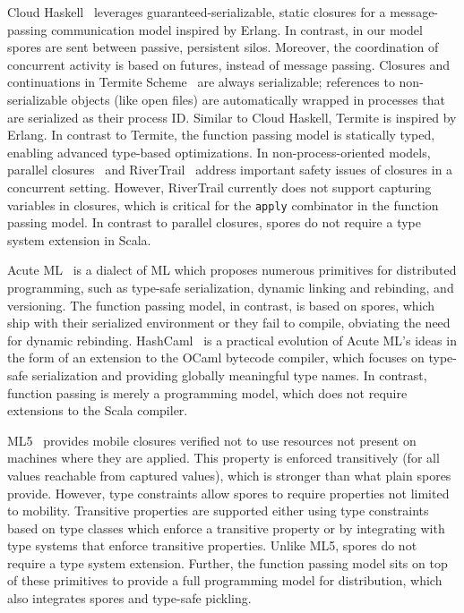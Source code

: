 \documentclass{jfp1}
\begin{document}
Cloud Haskell~\cite{CloudHaskell} leverages guaranteed-serializable, static
closures for a message-passing communication model inspired by Erlang. In
contrast, in our model spores are sent between passive, persistent silos.
Moreover, the coordination of concurrent activity is based on futures, instead
of message passing. Closures and continuations in Termite
Scheme~\cite{TermiteScheme} are always serializable; references to
non-serializable objects (like open files) are automatically wrapped in
processes that are serialized as their process ID. Similar to Cloud Haskell,
Termite is inspired by Erlang. In contrast to Termite, the function passing
model is statically typed, enabling advanced type-based optimizations. In
non-process-oriented models, parallel closures~\cite{ParallelClosures} and
RiverTrail~\cite{RiverTrail} address important safety issues of closures in a
concurrent setting. However, RiverTrail currently does not support capturing
variables in closures, which is critical for the \texttt{apply} combinator in the
function passing model. In contrast to parallel closures, spores do not require
a type system extension in Scala.

Acute ML~\cite{AcuteML} is a dialect of ML which proposes numerous primitives
for distributed programming, such as type-safe serialization, dynamic linking
and rebinding, and versioning. The function passing model, in contrast, is based
on spores, which ship with their serialized environment or they fail to compile,
obviating the need for dynamic rebinding. HashCaml~\cite{DistOCaml} is a
practical evolution of Acute ML's ideas in the form of an extension to the OCaml
bytecode compiler, which focuses on type-safe serialization and providing
globally meaningful type names. In contrast, function passing is merely a
programming model, which does not require extensions to the Scala compiler.

ML5~\cite{Tom7} provides mobile closures verified not to use resources not
present on machines where they are applied. This property is enforced
transitively (for all values reachable from captured values), which is stronger
than what plain spores provide. However, type constraints allow spores to
require properties not limited to mobility. Transitive properties are supported
either using type constraints based on type classes which enforce a transitive
property or by integrating with type systems that enforce transitive properties.
Unlike ML5, spores do not require a type system extension. Further, the function
passing model sits on top of these primitives to provide a full programming
model for distribution, which also integrates spores and type-safe pickling.
\end{document}
